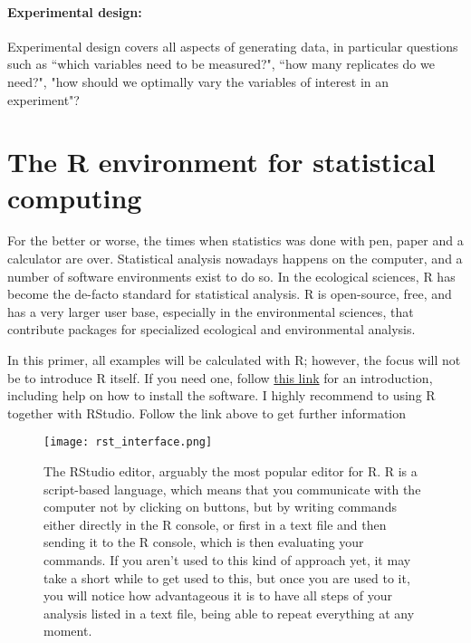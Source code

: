 \documentclass[a4paper,twoside]{tufte-book}\usepackage[]{graphicx}\usepackage[]{color}
\begin{document}
\paragraph{Experimental design:} Experimental design covers all aspects of generating data, in particular questions such as ``which variables need to be measured?", ``how many replicates do we need?", "how should we optimally vary the variables of interest in an experiment"?


\section{The R environment for statistical computing}

For the better or worse, the times when statistics was done with pen, paper and a calculator are over. Statistical analysis nowadays happens on the computer, and a number of software environments exist to do so. In the ecological sciences, R has become the de-facto standard for statistical analysis. R is open-source, free, and has a very larger user base, especially in the environmental sciences, that contribute packages for specialized ecological and environmental analysis.

In this primer, all examples will be calculated with R; however, the focus will not be to introduce R itself. If you need one, follow  \href{http://biometry.github.io/APES/R/R10-gettingStarted.html}{this link} for an introduction, including help on how to install the software. I highly recommend to using R together with RStudio. Follow the link above to get further information

\begin{figure}[]
\begin{center}
\texttt{[image: rst\_interface.png]}
\caption{The RStudio editor, arguably the most popular editor for R. R is a script-based language, which means that you communicate with the computer not by clicking on buttons, but by writing commands either directly in the R console, or first in a text file and then sending it to the R console, which is then evaluating your commands. If you aren't used to this kind of approach yet, it may take a short while to get used to this, but once you are used to it, you will notice how advantageous it is to have all steps of your analysis listed in a text file, being able to repeat everything at any moment.}
\label{fig: Rstudio}
\end{center}
\end{figure}
\end{document}
